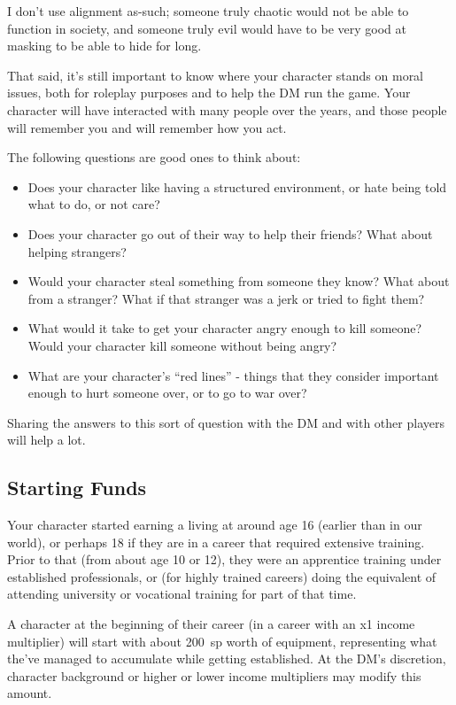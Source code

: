 I don't use alignment as-such; someone truly chaotic would not be able to
function in society, and someone truly evil would have to be very good at
masking to be able to hide for long.

That said, it's still important to know where your character stands on
moral issues, both for roleplay purposes and to help the DM run the game.
Your character will have interacted with many people over the years, and
those people will remember you and will remember how you act.

The following questions are good ones to think about:

\begin{itemize}
%
\item Does your character like having a structured environment, or hate
being told what to do, or not care?
%
\item Does your character go out of their way to help their friends? What
about helping strangers?
%
\item Would your character steal something from someone they know? What
about from a stranger? What if that stranger was a jerk or tried to fight
them?
%
\item What would it take to get your character angry enough to kill
someone? Would your character kill someone without being angry?
%
\item What are your character's ``red lines'' - things that they consider
important enough to hurt someone over, or to go to war over?
%
\end{itemize}

Sharing the answers to this sort of question with the DM and with other
players will help a lot.

%
\subsection{Starting Funds}

Your character started earning a living at around age 16 (earlier than in
our world), or perhaps 18 if they are in a career that required extensive
training. Prior to that (from about age 10 or 12), they were an apprentice
training under established professionals, or (for highly trained careers)
doing the equivalent of attending university or vocational training for
part of that time.

A character at the beginning of their career (in a career with an x1 income
multiplier) will start with about 200~sp worth of equipment, representing
what the've managed to accumulate while getting established. At the DM's
discretion, character background or higher or lower income multipliers may
modify this amount.

